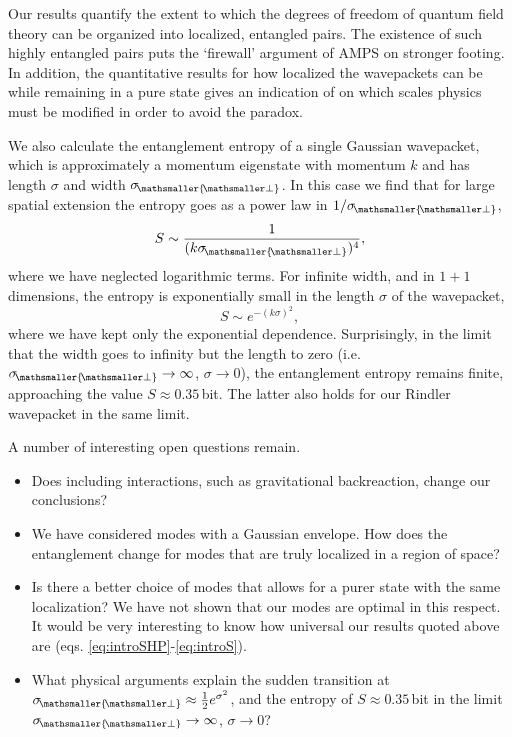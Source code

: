 \documentclass[11pt, a4paper]{article}
\newcommand{\si}{{\sigma}}
\newcommand{\sfrac}[2]{{\textstyle\frac{#1}{#2}}}
\newcommand{\half}{\sfrac{1}{2}}
\let\perptmp\perp
\renewcommand{\perp}{{\! \mathsmaller{\perptmp}}}
\begin{document}
Our results quantify the extent to which the degrees of freedom of quantum field theory can be organized into localized, entangled pairs. The existence of such highly entangled pairs puts the `firewall' argument of AMPS on stronger footing. In addition, the quantitative results for how localized the wavepackets can be while remaining in a pure state gives an indication of on which scales physics must be modified in order to avoid the paradox.


We also calculate the entanglement entropy of a single Gaussian wavepacket, which is approximately a momentum eigenstate with momentum $k$ and has length $\si$ and width $\si_\perp$. In this case we find that for large spatial extension the entropy goes as a power law in $1/\si_\perp$,
\begin{equation}
S \sim \frac{1}{(k \si_\perp)^4},
\end{equation}
where we have neglected logarithmic terms.
For infinite width, and in $1+1$ dimensions, the entropy is exponentially small in the length $\si$ of the wavepacket,
\begin{equation}
\label{eq:introS}
S \sim e^{-(k \sigma)^2},
\end{equation}
where we have kept only the exponential dependence.
Surprisingly, in the limit that the width goes to infinity but the length to zero (i.e. $\si_\perp\to\infty$, $\si\to 0$), the entanglement entropy remains finite, approaching the value $S \approx 0.35\,$bit. 
The latter also holds for our Rindler wavepacket in the same limit. 

A number of interesting open questions remain. 
\begin{itemize}
\item Does including interactions, such as gravitational backreaction, change our conclusions?
\item We have considered modes with a Gaussian envelope. How does the entanglement change for modes that are truly localized in a region of space?
\item Is there a better choice of modes that allows for a purer state with the same localization? We have not shown that our modes are optimal in this respect. It would be very interesting to know how universal our results quoted above are (eqs. \ref{eq:introSHP}-\ref{eq:introS}).
\item{What physical arguments explain the sudden transition at $\si_\perp\approx\half e^{\si^2}$, and the entropy of $S\approx0.35\,$bit in the limit $\si_\perp\to\infty$, $\si\to 0$?}
\end{itemize}
\end{document}
